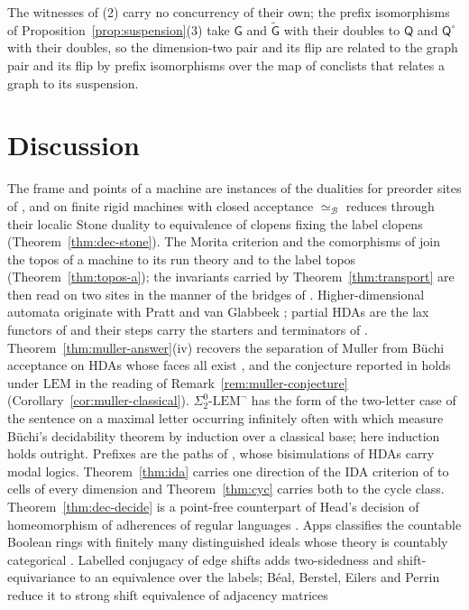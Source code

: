 \documentclass{lmcs}
\theoremstyle{definition}
\theoremstyle{remark}
\newcommand{\prin}[1]{\mathrm{#1}}
\newcommand{\EM}{\prin{LEM}}
\newcommand{\EIO}{\Sigma^0_2\text{-}\prin{LEM}^{\neg}}
\providecommand{\wQ}{\mathsf{Q}}
\providecommand{\eqB}{\simeq_{\mathcal{B}}}
\providecommand{\wG}{\mathsf{G}}
\providecommand{\wGt}{\tilde{\mathsf{G}}}
\providecommand{\wQ}{\mathsf{Q}}
\begin{document}
The witnesses of (2) carry no concurrency of their own; the prefix isomorphisms of
Proposition~\ref{prop:suspension}(3) take $\wG$ and $\wGt$ with their doubles to $\wQ$ and $\wQ^\circ$ with their
doubles, so the dimension-two pair and its flip are related to the graph pair and its flip by prefix isomorphisms
over the map of conclists that relates a graph to its suspension.
\section{Discussion}\label{sec:discussion}

The frame and points of a machine are instances of the dualities for preorder sites of
\cite{Caramello11}, and on
finite rigid machines with closed acceptance $\eqB$ reduces through their localic Stone duality to equivalence of
clopens fixing the label clopens (Theorem~\ref{thm:dec-stone}). The Morita criterion and the comorphisms of
\cite{Caramello19} join the topos of a machine to its run theory
and to the label topos (Theorem~\ref{thm:topos-a}); the invariants carried by Theorem~\ref{thm:transport} are then read on
two sites in the manner of the bridges of \cite{Caramello17}. Higher-dimensional automata originate with Pratt
\cite{Pratt91} and van Glabbeek \cite{vG91}; partial HDAs are the lax functors of \cite{BDFZ26} and
their steps carry the starters and terminators of \cite{FJSZ21}. Theorem~\ref{thm:muller-answer}(iv) recovers the
separation of Muller from B\"uchi acceptance on HDAs whose faces all exist
\cite{PAF25}, and the conjecture reported in
\cite{BDFZ26} holds under $\EM$ in the reading of
Remark~\ref{rem:muller-conjecture} (Corollary~\ref{cor:muller-classical}). $\EIO$ has the form of the two-letter case of the sentence
on a maximal letter occurring infinitely often with which \cite{KMPS19}
measure B\"uchi's decidability theorem by induction over a classical
base; here induction holds outright. Prefixes are the paths of
\cite{ZvGZ26}, whose bisimulations of HDAs carry modal logics. Theorem~\ref{thm:ida} carries one direction of the IDA
criterion of \cite{LP18} to cells of every dimension and
Theorem~\ref{thm:cyc} carries both to the cycle class. Theorem~\ref{thm:dec-decide} is a point-free counterpart of Head's decision of homeomorphism of adherences of regular
languages \cite{Head86}. Apps classifies the countable Boolean rings with finitely many distinguished ideals whose theory is countably categorical
\cite{Apps25}.
Labelled conjugacy of edge shifts adds two-sidedness and shift-equivariance to an equivalence over the labels;
B\'eal, Berstel, Eilers and Perrin reduce it to strong shift equivalence of adjacency matrices
\end{document}
